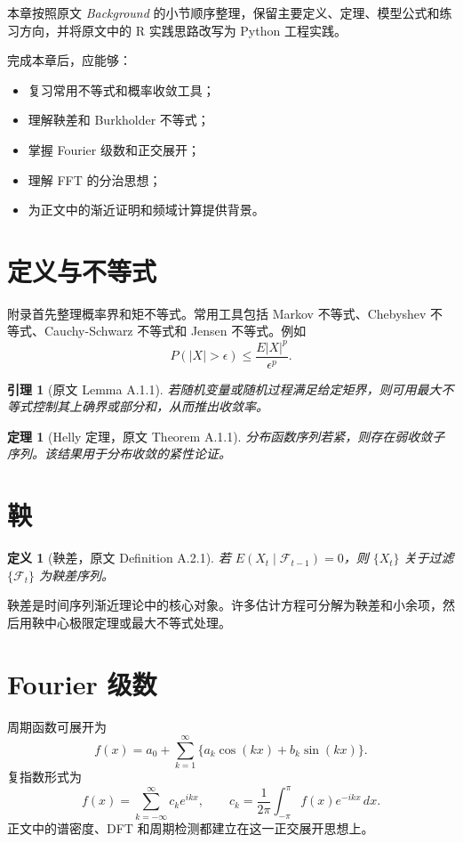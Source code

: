 \documentclass[11pt,a4paper,openany]{ctexbook}
\newtheorem{definition}{定义}[section]
\newtheorem{theorem}{定理}[section]
\newtheorem{lemma}{引理}[section]
\begin{document}
本章按照原文 \textit{Background} 的小节顺序整理，保留主要定义、定理、模型公式和练习方向，并将原文中的 R 实践思路改写为 Python 工程实践。

完成本章后，应能够：
\begin{itemize}
  \item 复习常用不等式和概率收敛工具；
  \item 理解鞅差和 Burkholder 不等式；
  \item 掌握 Fourier 级数和正交展开；
  \item 理解 FFT 的分治思想；
  \item 为正文中的渐近证明和频域计算提供背景。
\end{itemize}

\section{定义与不等式}

附录首先整理概率界和矩不等式。常用工具包括 Markov 不等式、Chebyshev 不等式、Cauchy-Schwarz 不等式和 Jensen 不等式。例如
\[
  P(|X|>\epsilon)\le \frac{E|X|^p}{\epsilon^p}.
\]

\begin{lemma}[原文 Lemma A.1.1]
若随机变量或随机过程满足给定矩界，则可用最大不等式控制其上确界或部分和，从而推出收敛率。
\end{lemma}

\begin{theorem}[Helly 定理，原文 Theorem A.1.1]
分布函数序列若紧，则存在弱收敛子序列。该结果用于分布收敛的紧性论证。
\end{theorem}

\section{鞅}

\begin{definition}[鞅差，原文 Definition A.2.1]
若 \(E(X_t\mid\mathcal F_{t-1})=0\)，则 \(\{X_t\}\) 关于过滤 \(\{\mathcal F_t\}\) 为鞅差序列。
\end{definition}

鞅差是时间序列渐近理论中的核心对象。许多估计方程可分解为鞅差和小余项，然后用鞅中心极限定理或最大不等式处理。

\section{Fourier 级数}

周期函数可展开为
\[
  f(x)=a_0+\sum_{k=1}^{\infty}\{a_k\cos(kx)+b_k\sin(kx)\}.
\]
复指数形式为
\[
  f(x)=\sum_{k=-\infty}^{\infty}c_ke^{ikx},
  \qquad
  c_k=\frac1{2\pi}\int_{-\pi}^{\pi}f(x)e^{-ikx}\,dx.
\]
正文中的谱密度、DFT 和周期检测都建立在这一正交展开思想上。
\end{document}
